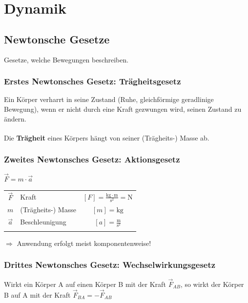 \section{Dynamik}
		
	\subsection{Newtonsche Gesetze}
		Gesetze, welche Bewegungen beschreiben.

		\subsubsection{Erstes Newtonsches Gesetz: Trägheitsgesetz}
			Ein Körper verharrt in seine Zustand (Ruhe, gleichförmige geradlinige Bewegung), wenn er nicht durch eine Kraft gezwungen wird, seinen Zustand zu ändern. \\
			\\
			Die \textbf{Trägheit} eines Körpers hängt von seiner (Trägheits-) Masse ab.
			
		\subsubsection{Zweites Newtonsches Gesetz: Aktionsgesetz}	
			\begin{minipage}{0.2\linewidth}
				$\boxed {\vec{F} = m \cdot \vec{a} }$
			\end{minipage}
			\hfill
			\begin{minipage}{0.75\linewidth}
				\begin{tabular}{c l c}
					$\vec{F}$ & Kraft & $[F] = \mathrm{\frac{kg \cdot m}{s^2}  = N}$ \\
					$m$ & (Trägheits-) Masse & $[m] = \mathrm{kg}$ \\	
					$\vec{a}$ &  Beschleunigung & $[a] = \mathrm{\frac{m}{s^2}}$ \\
					\\
				\end{tabular}
			\end{minipage}
				
			$\Rightarrow$ Anwendung erfolgt meist komponentenweise!
				
		\subsubsection{Drittes Newtonsches Gesetz: Wechselwirkungsgesetz}
			
		Wirkt ein Körper A auf einen Körper B mit der Kraft $\vec{F}_{AB}$, so wirkt der Körper B auf A mit der Kraft $\vec{F}_{BA} = - \vec{F}_{AB}$ \\

